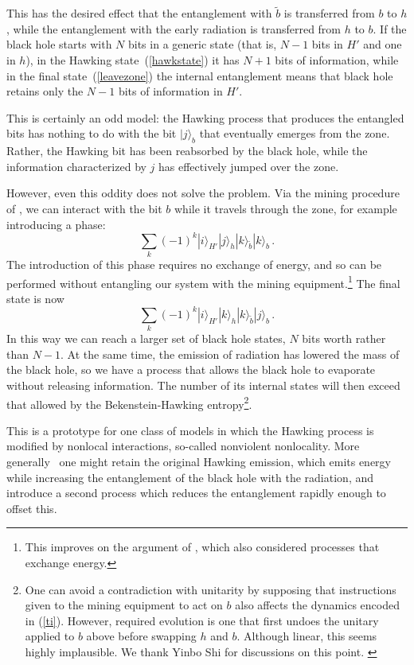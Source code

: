 \documentclass[12pt]{article}
\newcommand{\be}{\begin{equation}}
\newcommand{\ee}{\end{equation}}
\begin{document}
This has the desired effect that the entanglement with $\tilde b$ is transferred from $b$ to $h$, while the entanglement with the early radiation is transferred from $h$ to $b$.  If the black hole starts with $N$ bits in a generic state (that is, $N-1$ bits in $H'$ and one in $h$), in the Hawking state~(\ref{hawkstate}) it has $N+1$ bits of information, while in the final state~(\ref{leavezone}) the internal entanglement means that black hole retains only the $N-1$ bits of information in $H'$.

This is certainly an odd model: the Hawking process that produces the entangled bits has nothing to do with the bit $|j\rangle_{b}$ that eventually emerges from the {zone}.  Rather, the Hawking bit has been reabsorbed by the black hole, while the information characterized by $j$ has effectively jumped over the {zone}.

However, even this oddity does not solve the problem.  Via the mining procedure of \cite{Unruh:1982ic,Brown:2012un}, we can interact with the bit $b$ while it travels through the {zone}, for example introducing a phase:
\be
\sum_k  (-1)^k |i\rangle_{H'} |j\rangle_{h} |k\rangle_{\tilde b} |k\rangle_{b} \,.
\ee
{The introduction of this phase requires no exchange of energy, and so can be performed without entangling our system with the mining equipment.\footnote{This improves on the argument of \cite{Almheiri:2012rt}, which also considered processes that exchange energy.}}
The final state is now
\be
\sum_k (-1)^k   |i\rangle_{H'} |k\rangle_{h} |k\rangle_{\tilde b} |j\rangle_{b} \,.
\ee
In this way we can reach a larger set of black hole states, $N$ bits worth rather than $N-1$.  At the same time, the emission of radiation has lowered the mass of the black hole, so we have a process that allows the black hole to evaporate without releasing information.  The number of its internal states will then exceed that allowed by the Bekenstein-Hawking entropy\footnote{One can avoid a contradiction with unitarity by supposing that instructions given to the mining equipment to act on $b$ also affects the dynamics encoded in  (\ref{ti}).  However, required evolution is one that first undoes the unitary applied to $b$ above before swapping $h$ and $b$.   Although linear, this seems highly implausible.  We thank Yinbo Shi for discussions on this point. \label{implausible}}.



This is a prototype for one class of models in which the Hawking process is modified by nonlocal interactions, so-called nonviolent nonlocality.  More generally~\cite{Giddings:2011ks,Giddings:2012gc,Giddings:2013kcj} one might retain the original Hawking emission, which emits energy while increasing the entanglement of the black hole with the radiation, and introduce a second process which reduces the entanglement rapidly enough to offset this.
\end{document}
